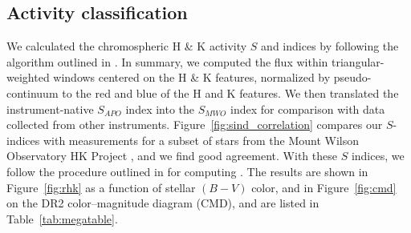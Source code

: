 \subsection{Activity classification}

We calculated the chromospheric  H \& K activity $S$ and \logrprime indices by following the algorithm outlined in \citet{Morris2017b}. In summary, we computed the flux within triangular-weighted windows centered on the  H \& K features, normalized by pseudo-continuum to the red and blue of the H and K features. We then translated the instrument-native $S_{APO}$ index into the $S_{MWO}$ index for comparison with data collected from other instruments. Figure~\ref{fig:sind_correlation} compares our $S$-indices with measurements for a subset of stars from the Mount Wilson Observatory HK Project \citep{Duncan1991}, and we find good agreement. With these $S$ indices, we follow the procedure outlined in \citet{Mittag2013} for computing \logrprime. The results are shown in Figure~\ref{fig:rhk} as a function of stellar $(B - V)$ color, 
and in Figure~\ref{fig:cmd} on the \gaia DR2 color--magnitude diagram (CMD), 
and are listed in Table~\ref{tab:megatable}. 




